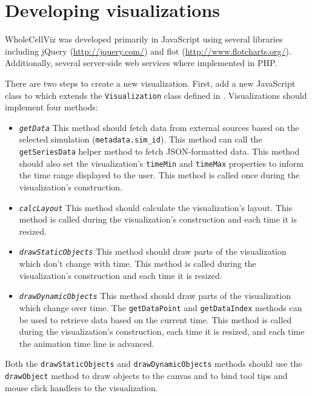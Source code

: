 \documentclass[twoside]{book}
\begin{document}
\chapter{Developing visualizations}

WholeCellViz was developed primarily in JavaScript using several libraries including jQuery (\url{http://jquery.com/}) and flot (\url{http://www.flotcharts.org/}). Additionally, several server-side web services where implemented in PHP.

There are two steps to create a new visualization. First, add a new JavaScript class to  which extends the \texttt{Visualization} class defined in . Visualizations should implement four methods:
\begin{itemize}
\item \texttt{\textit{getData}} {\textendash} This method should fetch data from external sources based on the selected simulation (\texttt{metadata.\-sim\_id}). This method can call the \texttt{getSeriesData} helper method to fetch JSON-formatted data. This method should also set the visualization's \texttt{timeMin} and \texttt{timeMax} properties to inform the time range displayed to the user. This method is called once during the visualization's construction.
\item \texttt{\textit{calcLayout}} {\textendash} This method should calculate the visualization's layout. This method is called during the visualization's construction and each time it is resized.
\item \texttt{\textit{drawStaticObjects}} {\textendash} This method should draw parts of the visualization which don't change with time. This method is called during the visualization's construction and each time it is resized.
\item \texttt{\textit{drawDynamicObjects}} {\textendash} This method should draw parts of the visualization which change over time. The \texttt{getDataPoint} and \texttt{getDataIndex} methods can be used to retrieve data based on the current time. This method is called during the visualization's construction, each time it is resized, and each time the animation time line is advanced. 
\end{itemize}

Both the \texttt{drawStaticObjects} and \texttt{drawDynamicObjects} methods should use the \texttt{drawObject} method to draw objects to the canvas and to bind tool tips and mouse click handlers to the visualization.
\end{document}
